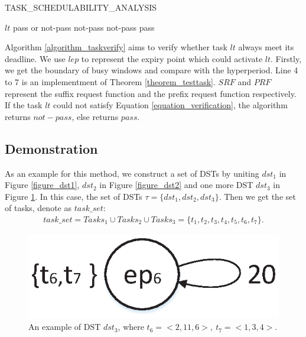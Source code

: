 \documentclass[conference]{IEEEtran}
\begin{document}
\begin{algorithm}
  \caption{TASK\_SCHEDULABILITY\_ANALYSIS}
  \label{algorithm_taskverify}
  \begin{algorithmic}[1]
    \REQUIRE $lt$
    \ENSURE pass or not-pass
    \STATE \Return not-pass
    \ELSE
    \STATE \Return not-pass
    \ENDIF
    \ENDFOR
    \ENDFOR
    \ENDFOR
    \STATE \Return pass
    \ENDIF
  \end{algorithmic}
\end{algorithm}

Algorithm \ref{algorithm_taskverify} aims to verify whether task $lt$ always meet its deadline. We use $lep$ to represent the expiry point which could activate $lt$. Firstly, we get the boundary of busy windows and compare with the hyperperiod. Line 4 to 7 is an implementment of Theorem \ref{theorem_testtask}. $SRF$ and $PRF$ represent the suffix request function and the prefix request function respectively. If the task $lt$ could not satisfy Equation \ref{equation_verification}, the algorithm returns $not-pass$, else returns $pass$.

\subsection{Demonstration}\label{section_demonstration}
As an example for this method, we construct a set of DSTs by uniting $dst_1$ in Figure \ref{figure_dst1}, $dst_2$ in Figure \ref{figure_dst2} and one more DST $dst_3$ in Figure \ref{figure_dst3}. In this case, the set of DSTs $\tau =\{dst_1,dst_2,dst_3\}$. Then we get the set of tasks, denote as $task\_set$: 
\[\begin{split}
task\_set=Tasks_1\cup Tasks_2\cup Tasks_3=\{t_1,t_2,t_3,t_4,t_5,t_6,t_7\}.
\end{split}\]

\begin{figure}
  \centering
  \includegraphics[scale=.4]{graphics/figure_dst3.eps}
  \caption{An example of DST $dst_3$, where $t_6=<2,11,6>,\ t_7=<1,3,4>$.} 
  \label{figure_dst3}
\end{figure}
\end{document}
